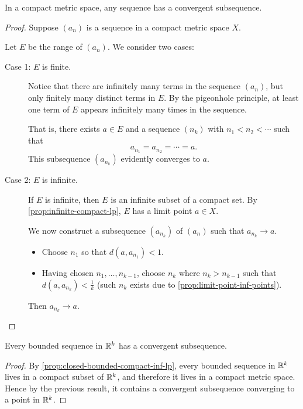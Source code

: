 \begin{proposition}
In a compact metric space, any sequence has a convergent subsequence.
\end{proposition}

\begin{proof}
Suppose $(a_n)$ is a sequence in a compact metric space $X$.

Let $E$ be the range of $(a_n)$. We consider two cases:
\begin{description}
\item[Case 1: $E$ is finite.] Notice that there are infinitely many terms in the sequence $(a_n)$, but only finitely many distinct terms in $E$. 
By the pigeonhole principle, at least one term of $E$ appears infinitely many times in the sequence.

That is, there exists $a\in E$ and a sequence $(n_k)$ with $n_1<n_2<\cdots$ such that
\[a_{n_1}=a_{n_2}=\cdots=a.\]
This subsequence $(a_{n_k})$ evidently converges to $a$.

\item[Case 2: $E$ is infinite.] If $E$ is infinite, then $E$ is an infinite subset of a compact set. By \ref{prop:infinite-compact-lp}, $E$ has a limit point $a\in X$.

We now construct a subsequence $(a_{n_k})$ of $(a_n)$ such that $a_{n_k}\to a$.
\begin{itemize}
\item Choose $n_1$ so that $d(a,a_{n_1})<1$. 
\item Having chosen $n_1,\dots,n_{k-1}$, choose $n_k$ where $n_k>n_{k-1}$ such that $d(a,a_{n_k})<\frac{1}{k}$ (such $n_k$ exists due to \ref{prop:limit-point-inf-points}).
\end{itemize}
Then $a_{n_k}\to a$.
\end{description}
\end{proof}

\begin{corollary}
Every bounded sequence in $\mathbb R^k$ has a convergent subsequence.
\end{corollary}

\begin{proof}
By \ref{prop:closed-bounded-compact-inf-lp}, every bounded sequence in $\mathbb R^k$ lives in a compact subset of $\mathbb R^k$, and therefore it lives in a compact metric space. Hence by the previous result, it contains a convergent subsequence converging to a point in $\mathbb R^k$.
\end{proof}

